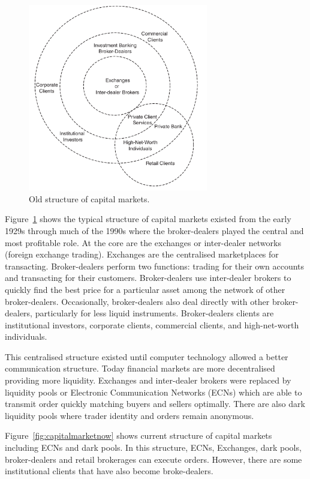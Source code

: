 \begin{figure}[!h]
  \centering
  \includegraphics[width=0.7\textwidth]{img/capitalmarkets}
  \caption{Old structure of capital markets.}
  \label{fig:capitalmarket}
\end{figure}
Figure~\ref{fig:capitalmarket} shows the typical structure of capital markets
existed from the early 1929s through much of the 1990s where the broker-dealers
played the central and most profitable role.  At the core are the exchanges or
inter-dealer networks (foreign exchange trading). Exchanges are the centralised
marketplaces for transacting.  Broker-dealers perform two functions: trading for
their own accounts and transacting for their customers. Broker-dealers use
inter-dealer brokers to quickly find the best price for a particular asset among
the network of other broker-dealers. Occasionally, broker-dealers also deal
directly with other broker-dealers, particularly for less liquid instruments.
Broker-dealers clients are institutional investors, corporate clients,
commercial clients, and high-net-worth individuals.

This centralised structure existed until computer technology allowed a better
communication structure. Today financial markets are more decentralised
providing more liquidity. Exchanges and inter-dealer brokers were replaced by
liquidity pools or Electronic Communication Networks (ECNs) which are able to
transmit order quickly matching buyers and sellers optimally. There are also
dark liquidity pools where trader identity and orders remain anonymous.

Figure~\ref{fig:capitalmarketnow} shows current structure of capital markets
including ECNs and dark pools. In this structure, ECNs, Exchanges, dark pools,
broker-dealers and retail brokerages can execute orders. However, there are some
institutional clients that have also become broke-dealers.

